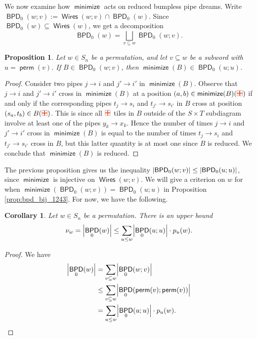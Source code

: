 \documentclass[11pt]{article}
\newtheorem{proposition}[theo]{Proposition}
\newtheorem{corollary}[theo]{Corollary}
\theoremstyle{definition}
\numberwithin{equation}{section}
\newcommand{\sseq}{\subseteq}
\DeclarePairedDelimiter\abs{\lvert}{\rvert}
\DeclareMathOperator{\perm}{\mathsf{perm}}
\DeclareMathOperator{\minimize}{\mathsf{minimize}}
\DeclareMathOperator{\Wires}{\mathsf{Wires}}
\DeclareMathOperator{\BPD}{\mathsf{BPD}}
\newcommand{\pipecolor}{UForange}
\newcommand{\tilescale}{0.27}
\newcommand{\drawSquare}{
    \draw[
        xshift=0.5cm,yshift=0.5cm,
        black,opacity=0.5,thin
    ] (0,0) rectangle (1,1);
}
\newcommand{\drawHorizontal}[2]{
    \draw[color=\pipecolor,very thick]
    (#1-0.5,#2) to (#1+0.5,#2);
}
\newcommand{\drawVertical}[2]{
    \draw[color=\pipecolor,very thick]
    (#1,#2-0.5) to (#1,#2+0.5);
}
\newcommand{\drawCross}[2]{
    \drawHorizontal{#1}{#2}
    \drawVertical{#1}{#2}
}
\newcommand{\cross}[1][scale=\tilescale,baseline=4pt]{
    \begin{tikzpicture}[#1]
    \drawSquare
    \drawCross11
    \end{tikzpicture}
}
\begin{document}
We now examine how $\minimize$ acts on reduced bumpless pipe dreams.
Write $\BPD_0(w;v) := \Wires(w;v)\cap \BPD_0(w)$.
Since $\BPD_0(w)\sseq \Wires(w)$, we get a decomposition \[
    \BPD_0(w) = \bigsqcup_{v\sseq w} \BPD_0(w;v).
\]

\begin{proposition}
\label{prop:bpd_include}
    Let $w\in S_n$ be a permutation, and let $v\sseq w$ be a subword with $u = \perm(v)$.
    If $B\in \BPD_0(w;v)$, then $\minimize(B) \in \BPD_0(u;u)$.
\end{proposition}

\begin{proof}
    Consider two pipes $j\to i$ and $j'\to i'$ in $\minimize(B)$.
    Observe that $j\to i$ and $j'\to i'$ cross in $\minimize(B)$ at a position $(a,b)\in \minimize(B)(\cross)$ if and only if the corresponding pipes $t_j\to s_i$ and $t_{j'}\to s_{i'}$ in $B$ cross at position $(s_a,t_b)\in B(\cross)$.
    This is since all $\cross$ tiles in $B$ outside of the $S\times T$ subdiagram involve at least one of the pipes $y_k\to x_k$.
    Hence the number of times $j\to i$ and $j'\to i'$ cross in $\minimize(B)$ is equal to the number of times $t_j\to s_i$ and $t_{j'}\to s_{i'}$ cross in $B$,
    but this latter quantity is at most one since $B$ is reduced.
    We conclude that $\minimize(B)$ is reduced.
\end{proof}

The previous proposition gives us the inequality $\abs*{\BPD_0(w;v)} \leq \abs*{\BPD_0(u;u)}$, since $\minimize$ is injective on $\Wires(w;v)$.
We will give a criterion on $w$ for when $\minimize(\BPD_0(w;v)) = \BPD_0(u;u)$ in Proposition \ref{prop:bpd_bij_1243}.
For now, we have the following.

\begin{corollary}
\label{cor:schub_ub}
    Let $w\in S_n$ be a permutation.
    There is an upper bound \[
        \nu_w = \abs*{\BPD_0(w)}
        \leq \sum_{u\leq w} \abs*{\BPD_0(u;u)}\cdot p_u(w).
    \]
\end{corollary}

\begin{proof}
    We have \begin{align*}
        \abs*{\BPD_0(w)}
        &= \sum_{v\sseq w} \abs*{\BPD_0(w;v)} \\
        &\leq \sum_{v\sseq w} \abs*{\BPD_0(\perm(v);\perm(v))} \\
        &= \sum_{u\leq w} \abs*{\BPD_0(u;u)} \cdot p_u(w). \qedhere
    \end{align*}
\end{proof}
\end{document}
